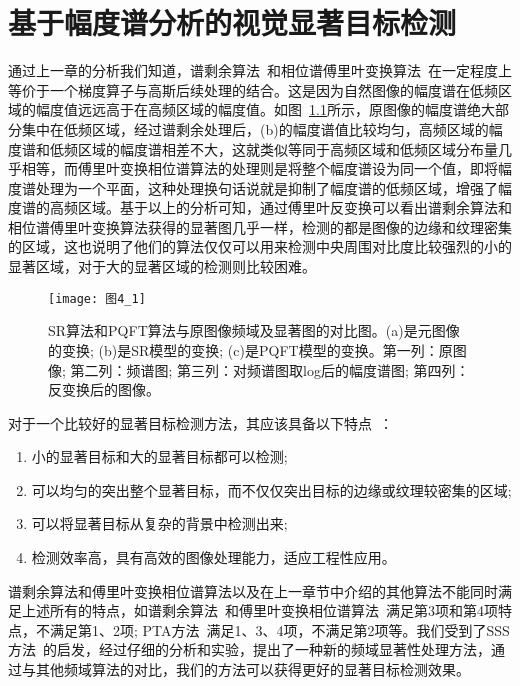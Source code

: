 
\chapter{基于幅度谱分析的视觉显著目标检测}
\label{cha4}

通过上一章的分析我们知道，谱剩余算法~\cite{HouXiaodiCVPR2007Residual}和相位谱傅里叶变换算法~\cite{GuoChenleiCVPR2008Spatio}在一定程度上等价于一个梯度算子与高斯后续处理的结合。这是因为自然图像的幅度谱在低频区域的幅度值远远高于在高频区域的幅度值。如图~\ref{图4_1}所示，原图像的幅度谱绝大部分集中在低频区域，经过谱剩余处理后，(b)的幅度谱值比较均匀，高频区域的幅度谱和低频区域的幅度谱相差不大，这就类似等同于高频区域和低频区域分布量几乎相等，而傅里叶变换相位谱算法的处理则是将整个幅度谱设为同一个值，即将幅度谱处理为一个平面，这种处理换句话说就是抑制了幅度谱的低频区域，增强了幅度谱的高频区域。基于以上的分析可知，通过傅里叶反变换可以看出谱剩余算法和相位谱傅里叶变换算法获得的显著图几乎一样，检测的都是图像的边缘和纹理密集的区域，这也说明了他们的算法仅仅可以用来检测中央周围对比度比较强烈的小的显著区域，对于大的显著区域的检测则比较困难。
\begin{figure}[h]
  \centering
  \texttt{[image: 图4\_1]}
  \caption{SR算法和PQFT算法与原图像频域及显著图的对比图。(a)是元图像的变换; (b)是SR模型的变换; (c)是PQFT模型的变换。第一列：原图像; 第二列：频谱图; 第三列：对频谱图取log后的幅度谱图; 第四列：反变换后的图像。}
  \label{图4_1}    
\end{figure}

对于一个比较好的显著目标检测方法，其应该具备以下特点~\cite{AchantaCVPR2009Frequency}：
\begin{enumerate}
\item 小的显著目标和大的显著目标都可以检测;
\item 可以均匀的突出整个显著目标，而不仅仅突出目标的边缘或纹理较密集的区域;
\item 可以将显著目标从复杂的背景中检测出来;
\item 检测效率高，具有高效的图像处理能力，适应工程性应用。
\end{enumerate}

谱剩余算法和傅里叶变换相位谱算法以及在上一章节中介绍的其他算法不能同时满足上述所有的特点，如谱剩余算法~\cite{HouXiaodiCVPR2007Residual}和傅里叶变换相位谱算法~\cite{GuoChenleiCVPR2008Spatio}满足第3项和第4项特点，不满足第1、2项; PTA方法~\cite{李崇飞2012相位谱}满足1、3、4项，不满足第2项等。我们受到了SSS方法~\cite{LiJianTPAMI2013Scale}的启发，经过仔细的分析和实验，提出了一种新的频域显著性处理方法，通过与其他频域算法的对比，我们的方法可以获得更好的显著目标检测效果。

